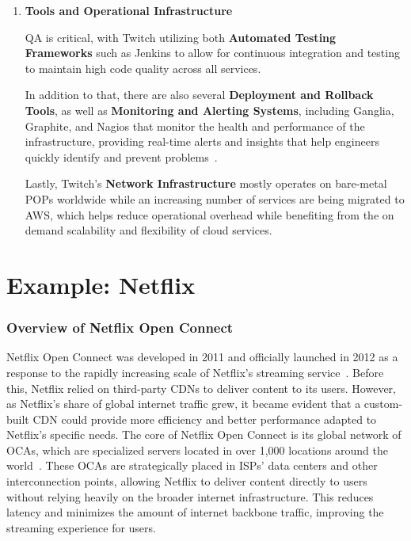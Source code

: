 \begin{enumerate}
    \item \textbf{Tools and Operational Infrastructure}

    \ac{QA} is critical, with Twitch utilizing both \textbf{Automated Testing Frameworks} such as Jenkins to allow for continuous integration and testing to maintain high code quality across all services.

    In addition to that, there are also several \textbf{Deployment and Rollback Tools}, as well as \textbf{Monitoring and Alerting Systems}, including Ganglia, Graphite, and Nagios that monitor the health and performance of the infrastructure, providing real-time alerts and insights that help engineers quickly identify and prevent problems~\parencite{twitch_engineering}.

    Lastly, Twitch’s \textbf{Network Infrastructure} mostly operates on bare-metal \ac{POPs} worldwide while an increasing number of services are being migrated to \ac{AWS}, which helps reduce operational overhead while benefiting from the on demand scalability and flexibility of cloud services.

\end{enumerate}

\section{Example: Netflix}


\subsubsection{Overview of Netflix Open Connect}

Netflix Open Connect was developed in 2011 and officially launched in 2012 as a response to the rapidly increasing scale of Netflix's streaming service~\parencite{netflix_functionality}. Before this, Netflix relied on third-party \ac{CDN}s to deliver content to its users. However, as Netflix's share of global internet traffic grew, it became evident that a custom-built \ac{CDN} could provide more efficiency and better performance adapted to Netflix's specific needs.
The core of Netflix Open Connect is its global network of \ac{OCAs}, which are specialized servers located in over 1,000 locations around the world~\parencite{netflix_open_connect}. These \ac{OCAs} are strategically placed in \ac{ISPs}' data centers and other interconnection points, allowing Netflix to deliver content directly to users without relying heavily on the broader internet infrastructure. This reduces latency and minimizes the amount of internet backbone traffic, improving the streaming experience for users.

